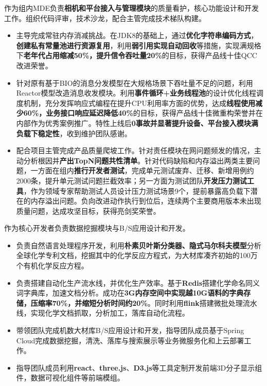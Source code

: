 \documentclass{resume}
\begin{document}
\begin{onehalfspacing}
作为组内MDE负责\textbf{相机和平台接入与管理模块}的质量看护，核心功能设计和开发工作。组织代码评审，技术沙龙，配合主管完成技术梯队构建。
\begin{itemize}
  \item 主导完成常驻内存消减挑战。在JDK8的基础上，通过\textbf{优化字符串编码方式}，\textbf{创建私有常量池进行资源复用}，利用\textbf{弱引用实现自动回收}等措施，实现满规格下\textbf{老年代占用缩减50\%，提升信令吞吐量20\%}的目标，获得产品线十佳QCC改进荣誉。
  \item 针对原有基于BIO的消息分发模型在大规格场景下吞吐量不足的问题，利用Reactor模型改造消息收发模块。利用\textbf{事件循环+业务线程池}的设计优化线程调度机制，充分发挥响应式编程在提升CPU利用率方面的优势，达成\textbf{线程使用减少60\%，业务接口响应延迟降低40\%}的目标，获得产品线十佳微重构荣誉并在内部作为优秀案例推广。特性上线后\textbf{0事故并显著提升设备、平台接入模块满负载下稳定性}，收到维护团队感谢。
  \item 配合项目主管完成产品质量爬坡工作。针对责任模块在网问题频发的情况，主动分析根因并\textbf{产出TopN问题共性清单}。针对代码缺陷和内存溢出两类主要问题，一方面在组内\textbf{推行开发者测试}，完成单元测试废弃、迁移、新增用例约2000条，提升单元测试问题拦截效率；另一方面为测试团队\textbf{开发压力测试工具}，作为领域专家帮助测试人员设计压力测试场景9个，提前暴露高负载下潜在的内存溢出问题。负向改进动作执行到位后，连续两个主要商用版本未出现质量问题，达成攻坚目标，获得亮剑奖荣誉。
\end{itemize}
\end{onehalfspacing}

\begin{onehalfspacing}
作为核心开发者负责数据挖掘模块与B/S应用设计和开发。
\begin{itemize}
  \item 负责自然语言处理程序开发，利用\textbf{朴素贝叶斯分类器、隐式马尔科夫模型}分析全球化学专利文档，挖掘其中的化学反应方程式，为大材库凑齐初始的100万个有机化学反应方程。
  \item 负责搭建自动化生产流水线，并优化生产效率。基于\textbf{Redis}搭建化学命名同义词字典库，加速文档分析。成功在\textbf{3G内存空间中实现越10G语料的字典存储，压缩率70\%，并缩短分析时间约20\%}。同时利用\textbf{flink}搭建微批处理流水线，实现化学文档抓取，分析加工，落库自动化流程。
  \item 带领团队完成机数大材库B/S应用设计和开发，指导团队成员基于Spring Cloud完成数据挖掘，清洗、落库与搜索展示等业务微服务化和上云部署工作。
  \item 指导团队成员利用\textbf{react}、\textbf{three.js}、\textbf{D3.js}等工具定制开发前端3D分子显示组件，数据可视化组件等前端模组。
\end{itemize}
\end{onehalfspacing}
\end{document}
